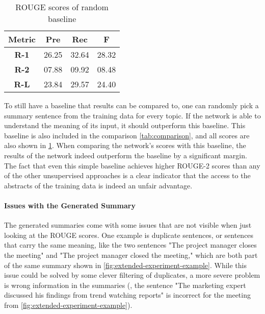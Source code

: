 \begin{table}[h]
\centering
\begin{tabular}{@{}clll@{}}
\toprule
\textbf{Metric} & \multicolumn{1}{c}{\textbf{Pre}} & \multicolumn{1}{c}{\textbf{Rec}} & \multicolumn{1}{c}{\textbf{F}} \\ \midrule
\textbf{R-1}    & 26.25                           & 32.64                           & 28.32                         \\
\textbf{R-2}    & 07.88                           & 09.92                           & 08.48                         \\
\textbf{R-L}    & 23.84                           & 29.57                           & 24.40                         \\ \bottomrule
\end{tabular}
\caption{ROUGE scores of random baseline}
\label{tab:extended-experiment-rouge-random}
\end{table}

To still have a baseline that results can be compared to, one can randomly pick a summary sentence from the training data for every topic.
If the network is able to understand the meaning of its input, it should outperform this baseline.
This baseline is also included in the comparison \cref{tab:comparison}, and all scores are also shown in \cref{tab:extended-experiment-rouge-random}.
When comparing the network's scores with this baseline, the results of the network indeed outperform the baseline by a significant margin.
The fact that even this simple baseline achieves higher ROUGE-2 scores than any of the other unsupervised approaches is a clear indicator that the access to the abstracts of the training data is indeed an unfair advantage.

\paragraph{Issues with the Generated Summary}

The generated summaries come with some issues that are not visible when just looking at the ROUGE scores.
One example is duplicate sentences, or sentences that carry the same meaning, like the two sentences "The project manager closes the meeting" and "The project manager closed the meeting," which are both part of the same summary shown in \cref{fig:extended-experiment-example}.
While this issue could be solved by some clever filtering of duplicates, a more severe problem is wrong information in the summaries (\eg, the sentence "The marketing expert discussed his findings from trend watching reports" is incorrect for the meeting from \cref{fig:extended-experiment-example}).